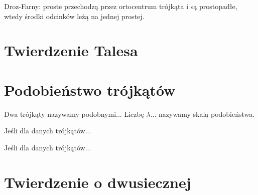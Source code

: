 Droz-Farny: proste przechodzą przez ortocentrum trójkąta i są prostopadłe, wtedy środki odcinków leżą na jednej prostej. %

%






\section{Twierdzenie Talesa}


\section{Podobieństwo trójkątów}
\begin{definition}
	Dwa trójkąty nazywamy podobnymi...
	Liczbę $\lambda$... nazywamy skalą podobieństwa.
\end{definition}

\begin{proposition}
	Jeśli dla danych trójkątów...
\end{proposition}

\begin{proposition}
	Jeśli dla danych trójkątów...
\end{proposition}




\section{Twierdzenie o dwusiecznej}

